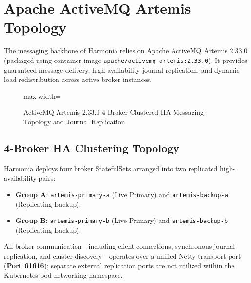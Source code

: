 
\chapter{Apache ActiveMQ Artemis Topology}
\label{chap:artemis_topology}

The messaging backbone of Harmonia relies on Apache ActiveMQ Artemis 2.33.0 (packaged using container image \texttt{apache/activemq-artemis:2.33.0}). It provides guaranteed message delivery, high-availability journal replication, and dynamic load redistribution across active broker instances.

\begin{figure}[htbp]
    \centering
    \begin{adjustbox}{max width=\textwidth}
        
    \end{adjustbox}
    \caption{ActiveMQ Artemis 2.33.0 4-Broker Clustered HA Messaging Topology and Journal Replication}
    \label{fig:artemis_cluster_topology}
\end{figure}

\section{4-Broker HA Clustering Topology}

Harmonia deploys four broker StatefulSets arranged into two replicated high-availability pairs:
\begin{itemize}
    \item \textbf{Group A}: \texttt{artemis-primary-a} (Live Primary) and \texttt{artemis-backup-a} (Replicating Backup).
    \item \textbf{Group B}: \texttt{artemis-primary-b} (Live Primary) and \texttt{artemis-backup-b} (Replicating Backup).
\end{itemize}

All broker communication---including client connections, synchronous journal replication, and cluster discovery---operates over a unified Netty transport port (\textbf{Port 61616}); separate external replication ports are not utilized within the Kubernetes pod networking namespace.


